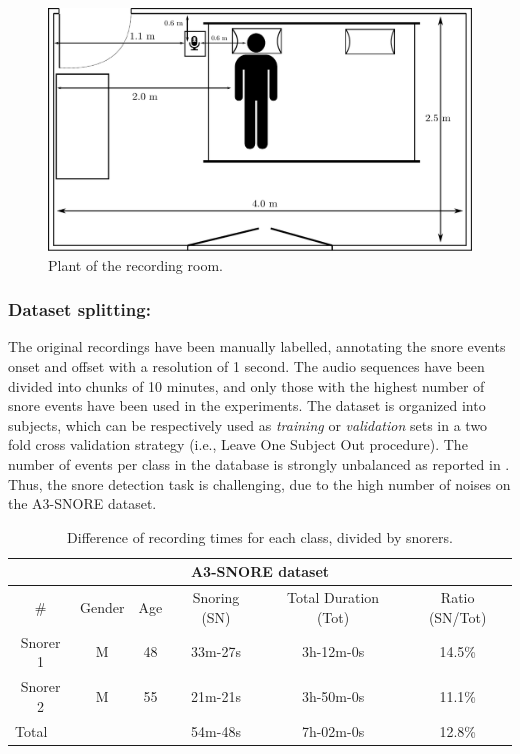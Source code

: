 \begin{figure}[t]
	\centering
	\includegraphics[width=0.8\columnwidth]{img/room.pdf}
	\caption{Plant of the recording room.} 
	\label{fig:room}
\end{figure}


\subsubsection{Dataset splitting:}
The original recordings have been manually labelled, annotating the snore events onset and offset with a resolution of 1 second. The audio sequences have been divided into chunks of 10 minutes, and only those with the highest number of snore events have been used in the experiments. 
The dataset is organized into subjects, which can be respectively used as \emph{training} or \emph{validation} sets in a two fold cross validation strategy (i.e., Leave One Subject Out procedure). The number of events per class in the database is strongly unbalanced as reported in . Thus, the snore detection task is challenging, due to the high number of noises on the A3-SNORE dataset. 

\begin{table}[ht]
	\centering
	\caption[A3-SNORE dataset]{Difference of recording times for each class, divided by snorers.}
	\begin{tabular}{cccccc}
		\hline
		\multicolumn{6}{c}{\textbf{A3-SNORE dataset}} \\
		\hline
		\# & Gender & Age & Snoring (SN) & Total Duration (Tot) & Ratio (SN/Tot) \\
		\hline
		Snorer 1 & M & 48 & 33m-27s & 3h-12m-0s & 14.5\% \\
		Snorer 2 & M & 55 & 21m-21s & 3h-50m-0s & 11.1\% \\
		\hline
		\multicolumn{3}{l}{Total} &	54m-48s	& 7h-02m-0s	& 12.8\%\\
		\hline    
	\end{tabular}	
	\label{a3snore} 
\end{table}

